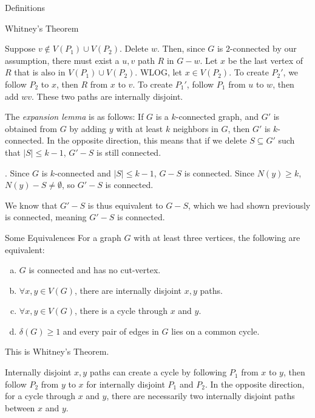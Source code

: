 \documentclass[10pt]{extarticle}
\begin{document}
\begin{problem}{Definitions}
\begin{problem}{Whitney's Theorem}
\begin{description}[font=\normalfont\scshape]
\begin{description}[font=\normalfont\scshape]
            Suppose $v\notin V(P_1) \cup V(P_2)$. Delete $w$. Then, since $G$ is $2$-connected by our assumption, there must exist a $u,v$ path $R$ in $G-w$. Let $x$ be the last vertex of $R$ that is also in $V(P_1) \cup V(P_2)$. WLOG, let $x\in V(P_2)$. To create $P_2'$, we follow $P_2$ to $x$, then $R$ from $x$ to $v$. To create $P_1'$, follow $P_1$ from $u$ to $w$, then add $wv$. These two paths are internally disjoint.
        \end{description}
    \end{description}
  \end{problem}
  The \textit{expansion lemma} is as follows: If $G$ is a $k$-connected graph, and $G'$ is obtained from $G$ by adding $y$ with at least $k$ neighbors in $G$, then $G'$ is $k$-connected. In the opposite direction, this means that if we delete $S\subseteq G'$ such that $|S| \leq k-1$, $G'-S$ is still connected.
  \begin{description}[font=\normalfont\scshape]
    \item[Case 1: $S\subseteq V(G)$]. Since $G$ is $k$-connected and $|S| \leq k-1$, $G-S$ is connected. Since $N(y) \geq k$, $N(y)-S \neq \emptyset$, so $G'-S$ is connected.
    \item[Case 2: $y\in S$] We know that $G'-S$ is thus equivalent to $G-S$, which we had shown previously is connected, meaning $G'-S$ is connected.
  \end{description}
  \begin{problem}{Some Equivalences}
    For a graph $G$ with at least three vertices, the following are equivalent:
    \begin{enumerate}[(a)]
      \item $G$ is connected and has no cut-vertex.
      \item $\forall x,y\in V(G)$, there are internally disjoint $x,y$ paths.
      \item $\forall x,y\in V(G)$, there is a cycle through $x$ and $y$.
      \item $\delta(G) \geq 1$ and every pair of edges in $G$ lies on a common cycle.
    \end{enumerate}
    \tcblower
    \begin{description}[font=\normalfont]
      \item[(a) $\Leftrightarrow$ (b):] This is Whitney's Theorem.
      \item[(b) $\Leftrightarrow$ (c):] Internally disjoint $x,y$ paths can create a cycle by following $P_1$ from $x$ to $y$, then follow $P_2$ from $y$ to $x$ for internally disjoint $P_1$ and $P_2$. In the opposite direction, for a cycle through $x$ and $y$, there are necessarily two internally disjoint paths between $x$ and $y$.
    \end{description}
  \end{problem}
\end{problem}
\end{document}
